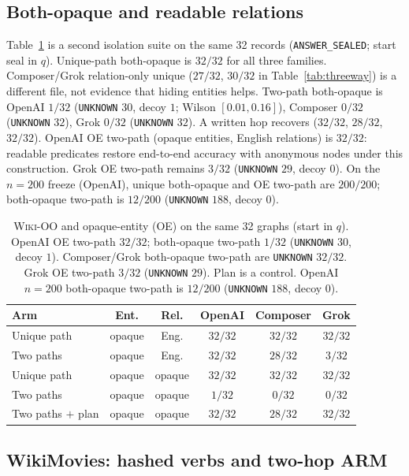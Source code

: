 \documentclass{article}
\begin{document}
\subsection{Both-opaque and readable relations}
\label{sec:oo}

Table~\ref{tab:entrel} is a second isolation suite on the same 32 records
(\texttt{ANSWER\_SEALED}; start seal in $q$). Unique-path both-opaque is
$32/32$ for all three families.
Composer/Grok relation-only unique ($27/32$, $30/32$ in
Table~\ref{tab:threeway}) is a different file, not evidence that hiding
entities helps. Two-path both-opaque is OpenAI $1/32$
(\texttt{UNKNOWN} $30$, decoy $1$; Wilson $[0.01,0.16]$), Composer $0/32$
(\texttt{UNKNOWN} $32$), Grok $0/32$ (\texttt{UNKNOWN} $32$). A written hop recovers
($32/32$, $28/32$, $32/32$). OpenAI OE two-path (opaque entities, English
relations) is $32/32$: readable predicates restore end-to-end accuracy with
anonymous nodes under this construction. Grok OE two-path remains $3/32$
(\texttt{UNKNOWN} $29$, decoy $0$).
On the $n{=}200$ freeze (OpenAI), unique both-opaque and OE two-path are
$200/200$; both-opaque two-path is $12/200$ (\texttt{UNKNOWN} $188$,
decoy $0$).

\begin{table}[t]
\centering
\small
\begin{tabular}{@{}lccccc@{}}
\toprule
Arm & Ent. & Rel. & OpenAI & Composer & Grok \\
\midrule
Unique path & opaque & Eng. & $32/32$ & $32/32$ & $32/32$ \\
Two paths & opaque & Eng. & $32/32$ & $28/32$ & $3/32$ \\
Unique path & opaque & opaque & $32/32$ & $32/32$ & $32/32$ \\
Two paths & opaque & opaque & $1/32$ & $0/32$ & $0/32$ \\
Two paths $+$ plan & opaque & opaque & $32/32$ & $28/32$ & $32/32$ \\
\bottomrule
\end{tabular}
\caption{\textsc{Wiki-OO} and opaque-entity (OE) on the same 32 graphs (start in $q$).
OpenAI OE two-path $32/32$; both-opaque two-path $1/32$
(\texttt{UNKNOWN} $30$, decoy $1$).
Composer/Grok both-opaque two-path are \texttt{UNKNOWN} $32/32$.
Grok OE two-path $3/32$ (\texttt{UNKNOWN} $29$). Plan is a control.
OpenAI $n{=}200$ both-opaque two-path is $12/200$ (\texttt{UNKNOWN} $188$,
decoy $0$).}
\label{tab:entrel}
\end{table}

\subsection{WikiMovies: hashed verbs and two-hop ARM}
\label{sec:movieb}
\end{document}
